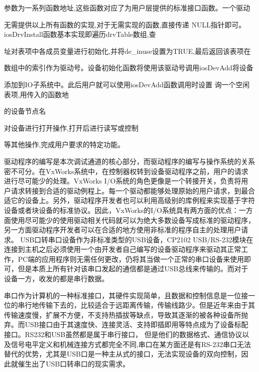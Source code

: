 参数为一系列函数地址,这些函数对应了为用户层提供的标准接口函数。一个驱动

无需提供以上所有函数的实现,对于无需实现的函数,直接传递 NULL指针即可。
iosDrvInstall函数基本实现即遍历drvTable数组,查

址对表项中各成员变量进行初始化,并将de_inuse设置为TRUE,最后返回该表项在

数组中的索引作为驱动号。设备初始化函数将使用该驱动号调用iosDevAdd将设备

添加到IO子系统中。此后用户就可以使用iosDevAdd函数调用时设置
询一个空闲表项,用传入的函数地

的设备节点名

对设备进行打开操作,打开后进行读写或控制

等其他操作,完成用户要求的特定功能。














驱动程序的编写是本次调试通道的核心部分，而驱动程序的编写与操作系统的关系密不可分。在VxWorks系统中，在控制器权转到设备驱动程序之前，用户的请求进行尽可能少的处理。VxWorks I/O系统的角色更像是一个转接开关，负责将用户请求转接到合适的驱动例程上。每一个驱动都能够处理原始的用户请求，到最合适它的设备上。另外，驱动程序开发者也可以利用高级别的库例程来实现基于字符设备或者块设备的标准协议。因此，VxWorks的I/O系统具有两方面的优点：一方面使用尽可能少的使用驱动相关代码就可以为绝大多数设备写成标准的驱动程序，另一方面驱动程序开发者可以在合适的地方使用非标准的程序自主的处理用户请求。
	USB口转串口设备作为非标准类型的USB设备，CP2102 USB/RS-232模块在连接到主机之后必须使用一个由开发者自己编写的设备驱动程序来驱动其正常工作，PC端的应用程序则无需任何更改，仍将其当做一个正常的串口设备来使用即可，但是本质上所有针对该串口发起的通信都是通过USB总线来传输的。而对于设备一方，收发的都是串行数据。	





串口作为计算机的一种标准接口，其硬件实现简单，且数据和控制信息是一位接一位的串行地传输下去的，比较适合于远距离传输，传输线路少。但是近年来由于其传输速度慢，扩展不方便，不支持热插拔等缺点，导致其逐渐的被各种设备所抛弃。而USB接口由于其速度快、连接灵活、支持即插即用等特点成为了设备标配接口。RS232和USB虽然都是属于串行接口， 但是他们的数据格式、通信协议以及信号电平定义和机械连接方式都完全不同\cite{何源2006USB},串口在某方面还是有RS-232串口无法替代的优势，尤其是USB口是一种主从式的接口，无法实现设备的双向控制，因此就催生出了USB口转串口的现实需求。









